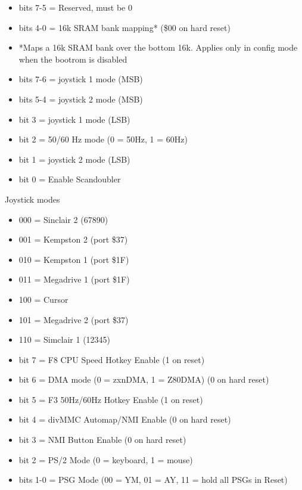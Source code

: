 \begin{itemize}
\item bits 7-5 = Reserved, must be 0
\item bits 4-0 = 16k SRAM bank mapping* (\$00 on hard reset)
\item[] *Maps a 16k SRAM bank over the bottom 16k. Applies only in
  config mode when the bootrom is disabled
\end{itemize}

\begin{itemize}
\item bits 7-6 = joystick 1 mode (MSB)
\item bits 5-4 = joystick 2 mode (MSB)
\item bit 3 = joystick 1 mode (LSB)
\item bit 2 = 50/60 Hz mode (0 = 50Hz, 1 = 60Hz)
\item bit 1 = joystick 2 mode (LSB)
\item bit 0 = Enable Scandoubler
\end{itemize}
Joystick modes
\begin{itemize}
\item 000 = Sinclair 2 (67890)
\item 001 = Kempston 2 (port \$37)
\item 010 = Kempston 1 (port \$1F)
\item 011 = Megadrive 1 (port \$1F)
\item 100 = Cursor
\item 101 = Megadrive 2 (port \$37)
\item 110 = Simclair 1 (12345)
\end{itemize}

\begin{itemize}
\item bit 7 = F8 CPU Speed Hotkey Enable (1 on reset)
\item bit 6 = DMA mode (0 = zxnDMA, 1 = Z80DMA) (0 on hard reset)
\item bit 5 = F3 50Hz/60Hz Hotkey Enable (1 on reset)
\item bit 4 = divMMC Automap/NMI Enable (0 on hard reset)
\item bit 3 = NMI Button Enable (0 on hard reset)
\item bit 2 = PS/2 Mode (0 = keyboard, 1 = mouse)
\item bits 1-0 = PSG Mode (00 = YM, 01 = AY, 11 = hold all PSGs in Reset)
\end{itemize}

